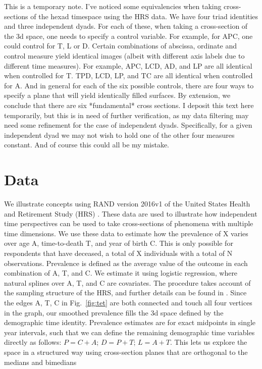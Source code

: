 \documentclass{bmcart}
\begin{document}
This is a temporary note. I've noticed some equivalencies when taking cross-sections of the hexad timespace using the HRS data. We have four triad identities and three independent dyads. For each of these, when taking a cross-section of the 3d space, one needs to specify a control variable. For example, for APC, one could control for T, L or D. Certain combinations of abscissa, ordinate and control measure yield identical images (albeit with different axis labels due to different time measures). For example, APC, LCD, AD, and LP are all identical when controlled for T. TPD, LCD, LP, and TC are all identical when controlled for A. And in general for each of the six possible controls, there are four ways to specify a plane that will yield identically filled surfaces. By extension, we conclude that there are six *fundamental* cross sections. I deposit this text here temporarily, but this is in need of further verification, as my data filtering may need some refinement for the case of independent dyads. Specifically, for a given independent dyad we may not wish to hold one of the other four measures constant. And of course this could all be my mistake.


\section*{Data}
We illustrate concepts using RAND version 2016v1 of the United States Health and Retirement Study (HRS) \citep{HRS, RAND}. These data are used to illustrate how independent time perspectives can be used to take cross-sections of phenomena with multiple time dimensions. We use these data to estimate how the prevalence of X varies over age A, time-to-death T, and year of birth C. This is only possible for respondents that have deceased, a total of X individuals with a total of N observations. Prevalence is defined as the average value of the outcome in each combination of A, T, and C. We estimate it using logistic regression, where natural splines over A, T, and C are covariates. The procedure takes account of the sampling structure of the HRS, and further details can be found in \citet{riffe2017hle}. Since the edges A, T, C in Fig.~\ref{fig:tet} are both connected and touch all four vertices in the graph, our smoothed prevalence fills the 3d space defined by the demographic time identity. Prevalence estimates are for exact midpoints in single year intervals, such that we can define the remaining demographic time variables directly as follows: $P = C + A$; $D = P + T$; $L = A + T$. This lets us explore the space in a structured way using cross-section planes that are orthogonal to the medians and bimedians 
\end{document}
